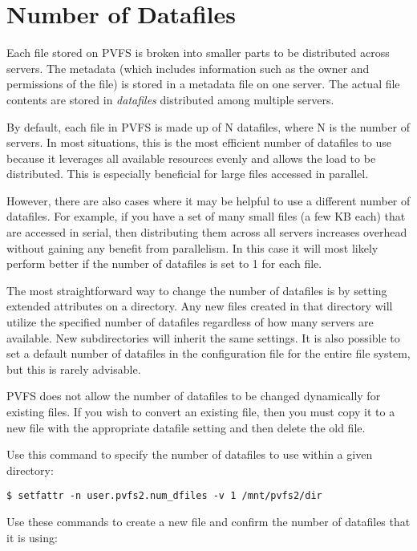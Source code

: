 \documentclass[11pt,letterpaper]{article}
\begin{document}
\section{Number of Datafiles}

Each file stored on PVFS is broken into smaller parts to be
distributed across servers.  The metadata (which includes
information such as the owner and permissions of the file) is stored in
a metadata file on one server.  The actual file contents are stored in
\emph{datafiles} distributed among multiple servers.

By default, each file in PVFS is made up of N datafiles, where N is
the number of servers.  In most situations, this is the most efficient
number of datafiles to use because it leverages all available resources
evenly and allows the load to be distributed.  This is especially
beneficial for large files accessed in parallel.

However, there are also cases where it may be helpful to use a different
number of datafiles.  For example, if you have a set of many small
files (a few KB each) that are accessed in serial, then distributing
them across all servers increases overhead without gaining any benefit
from parallelism.  In this case it will most likely perform better if
the number of datafiles is set to 1 for each file.

The most straightforward way to change the number of datafiles is by
setting extended attributes on a directory.  Any new files created in
that directory will utilize the specified number of datafiles
regardless of how many servers are available.  New subdirectories will
inherit the same settings.  It is also possible to set a default number
of datafiles in the configuration file for the entire file system, but
this is rarely advisable.

PVFS does not allow the number of datafiles to be changed dynamically
for existing files.  If you wish to convert an existing file, then you must
copy it to a new file with the appropriate datafile setting and then delete
the old file.

Use this command to specify the number of datafiles to use within a given
directory:

\begin{verbatim}
$ setfattr -n user.pvfs2.num_dfiles -v 1 /mnt/pvfs2/dir
\end{verbatim}

Use these commands to create a new file and confirm the number of
datafiles that it is using:
\end{document}
